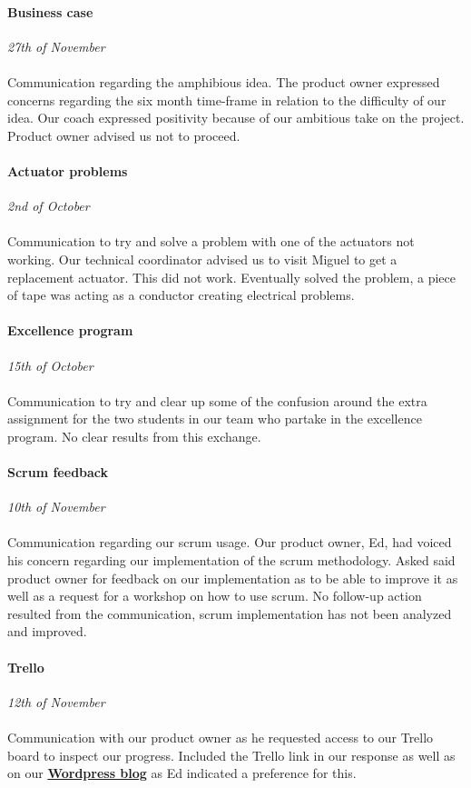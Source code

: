 \documentclass[12pt]{article}
\begin{document}
	\paragraph{Business case}\mbox{}
	\emph{27th of November}\\
	\\Communication regarding the amphibious idea. The product owner expressed concerns regarding the six month time-frame in relation to the difficulty of our idea. Our coach expressed positivity because of our ambitious take on the project. Product owner advised us not to proceed.
	\paragraph{Actuator problems}\mbox{}
	\emph{2nd of October}\\
	\\Communication to try and solve a problem with one of the actuators not working. Our technical coordinator advised us to visit Miguel to get a replacement actuator. This did not work. Eventually solved the problem, a piece of tape was acting as a conductor creating electrical problems.
	\paragraph{Excellence program}\mbox{}
	\emph{15th of October}\\
	\\Communication to try and clear up some of the confusion around the extra assignment for the two students in our team who partake in the excellence program. No clear results from this exchange.
	\paragraph{Scrum feedback}
	\emph{10th of November}\\
	\\Communication regarding our scrum usage. Our product owner, Ed, had voiced his concern regarding our implementation of the scrum methodology. Asked said product owner for feedback on our implementation as to be able to improve it as well as a request for a workshop on how to use scrum. No follow-up action resulted from the communication, scrum implementation has not been analyzed and improved.
	\paragraph{Trello}\mbox{}
	\emph{12th of November}\\
	\\Communication with our product owner as he requested access to our Trello board to inspect our progress. Included the Trello link in our response as well as on our \href{https://metabotsrow.wordpress.com/}{\textbf{Wordpress blog}} as Ed indicated a preference for this.
\end{document}
